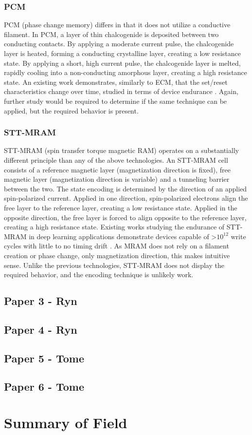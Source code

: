 \documentclass[sigconf,authoryear]{acmart}
\begin{document}
\subsubsection{PCM}
PCM (phase change memory) differs in that it does not utilize a conductive filament. In PCM, a layer of thin chalcogenide is deposited 
between two conducting contacts. By applying a moderate current pulse, the chalcogenide layer is heated, forming a conducting 
crystalline layer, creating a low resistance state. By applying a short, high current pulse, the chalcogenide layer is melted, 
rapidly cooling into a non-conducting amorphous layer, creating a high resistance state. An existing work demonstrates, similarly to ECM, 
that the set/reset characteristics change over time, studied in terms of device endurance \cite{PCM}. Again, further study would be 
required to determine if the same technique can be applied, but the required behavior is present.

\subsubsection{STT-MRAM}
STT-MRAM (spin transfer torque magnetic RAM) operates on a substantially different principle than any of the above technologies. 
An STT-MRAM cell consists of a reference magnetic layer (magnetization direction is fixed), free magnetic layer (magnetization direction 
is variable) and a tunneling barrier between the two. The state encoding is determined by the direction of an applied spin-polarized 
current. Applied in one direction, spin-polarized electrons align the free layer to the reference layer, creating a low resistance state. 
Applied in the opposite direction, the free layer is forced to align opposite to the reference layer, creating a high resistance state. 
Existing works studying the endurance of STT-MRAM in deep learning applications demonstrate devices capable of >$10^{12}$ write cycles 
with little to no timing drift \cite{MRAM}. As MRAM does not rely on a filament creation or phase change, only magnetization direction, 
this makes intuitive sense. Unlike the previous technologies, STT-MRAM does not display the required behavior, and the encoding technique 
is unlikely work.


\subsection{Paper 3 - Ryn}


\subsection{Paper 4 - Ryn } 

\subsection{Paper 5 - Tome}

\subsection{Paper 6 - Tome}

\section{Summary of Field}
\begin{comment}
    - field summary
    - paragraph
\end{comment}




\end{document}
